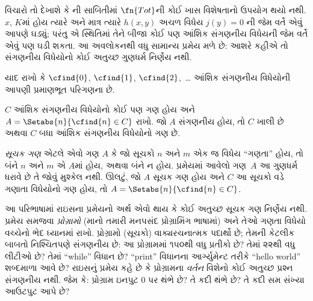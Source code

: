 \documentclass[../../../include/open-logic-section]{subfiles}
\begin{document}

વિચારો તો દેખાશે કે ની સાબિતીમાં
$\fn{Tot}$ની કોઈ ખાસ વિશેષતાનો ઉપયોગ થયો નથી. $x$, $K$માં
હોય ત્યારે અને માત્ર ત્યારે $h(x,y)$ અચળ વિધેય $j(y) = 0$
ની જેમ વર્તે એવું આપણે ઘડ્યું; પરંતુ એ સ્થિતિમાં તેને
બીજા કોઈ પણ આંશિક સંગણનીય વિધેયની જેમ વર્તે એવું પણ
ઘડી શકતા. આ અવલોકનથી વધુ સામાન્ય પ્રમેય મળે છે:
આશરે કહીએ તો સંગણનીય વિધેયોનો કોઈ અતુચ્છ ગુણધર્મ
નિર્ણેય નથી.

યાદ રાખો કે $\cfind{0}$, $\cfind{1}$, $\cfind{2}$,~\dots
આંશિક સંગણનીય વિધેયોની આપણી પ્રમાણભૂત પરિગણના છે.

\begin{thm}[રાઇસનું પ્રમેય]
  $C$ આંશિક સંગણનીય વિધેયોનો કોઈ પણ ગણ હોય અને
  $A = \Setabs{n}{\cfind{n} \in C}$ રાખો. જો $A$ સંગણનીય
  હોય, તો $C$ ખાલી છે અથવા $C$ બધા આંશિક સંગણનીય
  વિધેયોનો ગણ છે.
\end{thm}

\emph{સૂચક ગણ} એટલે એવો ગણ $A$ કે જો સૂચકો $n$ અને $m$
એક જ વિધેય ``ગણતા'' હોય, તો બંને $n$ અને $m$ એ $A$માં
હોય, અથવા બંને ન હોય. પ્રમેયમાં આવેલો ગણ~$A$ આ
ગુણધર્મ ધરાવે છે તે જોવું મુશ્કેલ નથી. ઊલટું, જો $A$
સૂચક ગણ હોય અને $C$ આ સૂચકો વડે ગણાતા વિધેયોનો ગણ
હોય, તો $A = \Setabs{n}{\cfind{n} \in C}$.

\begin{explain}
આ પરિભાષામાં રાઇસના પ્રમેયનો અર્થ એવો થાય કે કોઈ અતુચ્છ
સૂચક ગણ નિર્ણેય નથી. પ્રમેય સમજવા \emph{પ્રોગ્રામો}
(માનો તમારી મનપસંદ પ્રોગ્રામિંગ ભાષામાં) અને તેઓ ગણતા
વિધેયો વચ્ચેનો ભેદ ધ્યાનમાં રાખો. પ્રોગ્રામો (સૂચકો)
વાક્યરચનાત્મક પદાર્થો છે; તેમની કેટલીક બાબતો નિશ્ચિતપણે
સંગણનીય છે: આ પ્રોગ્રામમાં ૧૫૦થી વધુ પ્રતીકો છે? તેમાં
૨૨થી વધુ લીટીઓ છે? તેમાં ``while'' વિધાન છે? ``print''
વિધાનના આર્ગ્યુમેન્ટ તરીકે ``hello world'' શબ્દમાળા આવે
છે? રાઇસનું પ્રમેય કહે છે કે પ્રોગ્રામના \emph{વર્તન}
વિશેનો કોઈ અતુચ્છ પ્રશ્ન સંગણનીય નથી. જેમ કે: પ્રોગ્રામ
ઇનપુટ $0$ પર થંભે છે? તે કદી થંભે છે? તે કદી સમ સંખ્યા
આઉટપુટ આપે છે?
\end{explain}
\end{document}

